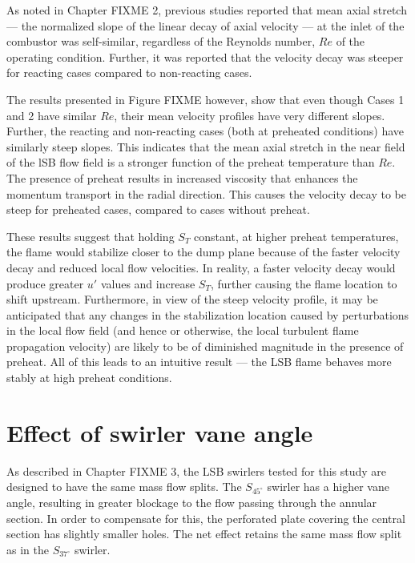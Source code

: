 As noted in Chapter FIXME 2, previous studies\cite{2008-cheng-a} reported that mean axial stretch --- the normalized slope of the linear decay of axial velocity --- at the inlet of the combustor was self-similar, regardless of the Reynolds number, \(Re\) of the operating condition.
Further, it was reported that the velocity decay was steeper for reacting cases compared to non-reacting cases.

The results presented in Figure FIXME however, show that even though Cases 1 and 2 have similar \(Re\), their mean velocity profiles have very different slopes.
Further, the reacting and non-reacting cases (both at preheated conditions) have similarly steep slopes.
This indicates that the mean axial stretch in the near field of the lSB flow field is a stronger function of the preheat temperature than \(Re\).
The presence of preheat results in increased viscosity that enhances the momentum transport in the radial direction.
This causes the velocity decay to be steep for preheated cases, compared to cases without preheat.

These results suggest that holding \(S_T\) constant, at higher preheat temperatures, the flame would stabilize closer to the dump plane because of the faster velocity decay and reduced local flow velocities.
In reality, a faster velocity decay would produce greater \(u'\) values and increase \(S_T\), further causing the flame location to shift upstream.
Furthermore, in view of the steep velocity profile, it may be anticipated that any changes in the stabilization location caused by perturbations in the local flow field (and hence or otherwise, the local turbulent flame propagation velocity) are likely to be of diminished magnitude in the presence of preheat.
All of this leads to an intuitive result --- the LSB flame behaves more stably at high preheat conditions.

\section{Effect of swirler vane angle}
\label{sec:vaneAngleEffect}

As described in Chapter FIXME 3, the LSB swirlers tested for this study are designed to have the same mass flow splits.
The \(S_{45^\circ}\) swirler has a higher vane angle, resulting in greater blockage to the flow passing through the annular section.
In order to compensate for this, the perforated plate covering the central section has slightly smaller holes.
The net effect retains the same mass flow split as in the \(S_{37^\circ}\) swirler.

